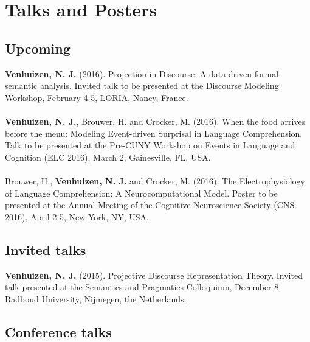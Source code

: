 \documentclass[a4paper,10pt]{article}
\begin{document}
\section*{Talks and Posters}

\subsection*{Upcoming}

\noindent
    \textbf{Venhuizen, N. J.} (2016). Projection in Discourse: A data-driven
    formal semantic analysis. Invited talk to be presented at the Discourse
    Modeling Workshop, February 4-5, LORIA, Nancy, France.\\
    \\
    \textbf{Venhuizen, N. J.}, Brouwer, H. and Crocker, M. (2016). When the
    food arrives before the menu: Modeling Event-driven Surprisal in Language
    Comprehension. Talk to be presented at the Pre-CUNY Workshop on Events in
    Language and Cognition (ELC 2016), March 2, Gainesville, FL, USA.\\
    \\
    Brouwer, H., \textbf{Venhuizen, N. J.} and Crocker, M. (2016). The
    Electrophysiology of Language Comprehension: A Neurocomputational Model.
    Poster to be presented at the Annual Meeting of the Cognitive Neuroscience
    Society (CNS 2016), April 2-5, New York, NY, USA.

\subsection*{Invited talks}

\noindent
    \textbf{Venhuizen, N. J.} (2015). Projective Discourse Representation
    Theory. Invited talk presented at the Semantics and Pragmatics
    Colloquium, December 8, Radboud University, Nijmegen, the Netherlands.

\subsection*{Conference talks}
\end{document}
